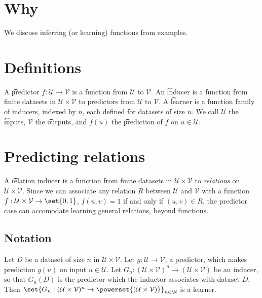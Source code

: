 
\section*{Why}

We discuss inferring (or learning) functions from examples.

\section*{Definitions}

A \t{predictor} $f: \mathcal{U}  \to \mathcal{V} $ is a function from $\mathcal{U} $ to $\mathcal{V} $.
An \t{inducer} is a function from finite datasets in $\mathcal{U}  \times  \mathcal{V} $ to predictors from $\mathcal{U} $ to $\mathcal{V} $.
A \t{learner} is a function family of inducers, indexed by $n$, each defined for datasets of size $n$.
We call $\mathcal{U} $ the \t{inputs}, $\mathcal{V} $ the \t{outputs}, and $f(u)$ the \t{prediction} of $f$ on $u \in \mathcal{U} $.

\section*{Predicting relations}

A \t{relation inducer} is a function from finite datasets in $\mathcal{U}  \times  \mathcal{V} $ to \textit{relations} on $\mathcal{U}  \times  \mathcal{V} $.
Since we can associate any relation $R$ between $\mathcal{U} $ and $\mathcal{V} $ with a function $f: \mathcal{U}  \times \mathcal{V}  \to \set{0, 1}$, $f(u, v) = 1$ if and only if $(u, v) \in R$, the predictor case can accomodate learning general relations, beyond functions.

\subsection*{Notation}

Let $D$ be a dataset of size $n$ in $\mathcal{U}  \times \mathcal{V} $.
Let $g: \mathcal{U}  \to \mathcal{V} $, a predictor, which makes prediction $g(u)$ on input $u \in \mathcal{U} $.
Let $G_n: (\mathcal{U}  \times  \mathcal{V} )^n \to (\mathcal{U} \times  \mathcal{V} )$ be an inducer, so that $G_n(D)$ is the predictor which the inductor associates with dataset $D$.
Then $\set{G_n: (\mathcal{U}  \times  \mathcal{V} )^n \to \powerset{(\mathcal{U}  \times  \mathcal{V} )}}_{n \in \N }$ is a learner.

